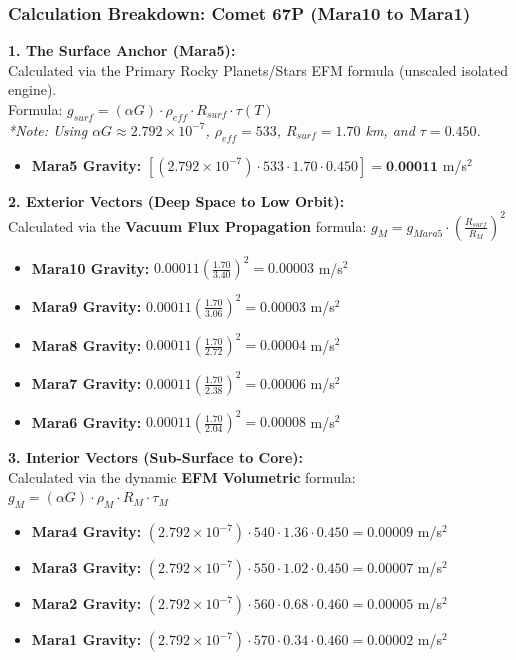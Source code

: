 \documentclass[11pt, a4paper]{article}
\begin{document}
\clearpage
\subsubsection{Calculation Breakdown: Comet 67P (Mara10 to Mara1)}

\noindent \textbf{1. The Surface Anchor (Mara5):} \\
Calculated via the Primary Rocky Planets/Stars EFM formula (unscaled isolated engine). \\
Formula: $g_{surf} = (\alpha G) \cdot \rho_{eff} \cdot R_{surf} \cdot \tau(T)$ \\
\textit{*Note: Using $\alpha G \approx 2.792 \times 10^{-7}$, $\rho_{eff} = 533$, $R_{surf} = 1.70$ km, and $\tau = 0.450$.}
\begin{itemize}
  \item \textbf{Mara5 Gravity:} $\left[ (2.792 \times 10^{-7}) \cdot 533 \cdot 1.70 \cdot 0.450 \right] = \textbf{0.00011}$ m/s$^2$
\end{itemize}

\vspace{0.5em}
\noindent \textbf{2. Exterior Vectors (Deep Space to Low Orbit):} \\
Calculated via the \textbf{Vacuum Flux Propagation} formula: $g_M = g_{Mara5} \cdot \left( \frac{R_{surf}}{R_M} \right)^2$
\begin{itemize}
  \item \textbf{Mara10 Gravity:} $0.00011 \left( \frac{1.70}{3.40} \right)^2 = 0.00003$ m/s$^2$
  \item \textbf{Mara9 Gravity:} $0.00011 \left( \frac{1.70}{3.06} \right)^2 = 0.00003$ m/s$^2$
  \item \textbf{Mara8 Gravity:} $0.00011 \left( \frac{1.70}{2.72} \right)^2 = 0.00004$ m/s$^2$
  \item \textbf{Mara7 Gravity:} $0.00011 \left( \frac{1.70}{2.38} \right)^2 = 0.00006$ m/s$^2$
  \item \textbf{Mara6 Gravity:} $0.00011 \left( \frac{1.70}{2.04} \right)^2 = 0.00008$ m/s$^2$
\end{itemize}

\vspace{0.5em}
\noindent \textbf{3. Interior Vectors (Sub-Surface to Core):} \\
Calculated via the dynamic \textbf{EFM Volumetric} formula: $g_M = (\alpha G) \cdot \rho_{M} \cdot R_M \cdot \tau_M$
\begin{itemize}
  \item \textbf{Mara4 Gravity:} $(2.792 \times 10^{-7}) \cdot 540 \cdot 1.36 \cdot 0.450 = 0.00009$ m/s$^2$
  \item \textbf{Mara3 Gravity:} $(2.792 \times 10^{-7}) \cdot 550 \cdot 1.02 \cdot 0.450 = 0.00007$ m/s$^2$
  \item \textbf{Mara2 Gravity:} $(2.792 \times 10^{-7}) \cdot 560 \cdot 0.68 \cdot 0.460 = 0.00005$ m/s$^2$
  \item \textbf{Mara1 Gravity:} $(2.792 \times 10^{-7}) \cdot 570 \cdot 0.34 \cdot 0.460 = 0.00002$ m/s$^2$
\end{itemize}
\end{document}
